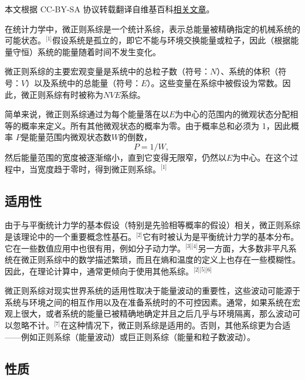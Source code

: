 
本文根据 CC-BY-SA 协议转载翻译自维基百科\href{https://en.wikipedia.org/wiki/Microcanonical_ensemble}{相关文章}。

在统计力学中，微正则系综是一个统计系综，表示总能量被精确指定的机械系统的可能状态。\(^\text{[1]}\)假设系统是孤立的，即它不能与环境交换能量或粒子，因此（根据能量守恒）系统的能量随着时间不发生变化。

微正则系综的主要宏观变量是系统中的总粒子数（符号：\( N \)）、系统的体积（符号：\( V \)）以及系统中的总能量（符号：\( E \)）。这些变量在系综中被假设为常数。因此，微正则系综有时被称为\(NVE\)系综。

简单来说，微正则系综通过为每个能量落在以\( E \)为中心的范围内的微观状态分配相等的概率来定义。所有其他微观状态的概率为零。由于概率总和必须为 1，因此概率 \( P \)是能量范围内微观状态数\( W \)的倒数，
\[
P = 1/W,~
\]
然后能量范围的宽度被逐渐缩小，直到它变得无限窄，仍然以\( E \)为中心。在这个过程中，当宽度趋于零时，得到微正则系综。\(^\text{[1]}\)
\subsection{适用性}  
由于与平衡统计力学的基本假设（特别是先验相等概率的假设）相关，微正则系综是该理论中的一个重要概念性基石。\(^\text{[2]}\)它有时被认为是平衡统计力学的基本分布。它在一些数值应用中也很有用，例如分子动力学。\(^\text{[3][4]}\)另一方面，大多数非平凡系统在微正则系综中的数学描述繁琐，而且在熵和温度的定义上也存在一些模糊性。因此，在理论计算中，通常更倾向于使用其他系综。\(^\text{[2][5][6]}\)

微正则系综对现实世界系统的适用性取决于能量波动的重要性，这些波动可能源于系统与环境之间的相互作用以及在准备系统时的不可控因素。通常，如果系统在宏观上很大，或者系统的能量已被精确地确定并且之后几乎与环境隔离，那么波动可以忽略不计。\(^\text{[7]}\)在这种情况下，微正则系综是适用的。否则，其他系综更为合适——例如正则系综（能量波动）或巨正则系综（能量和粒子数波动）。
\subsection{性质}  
